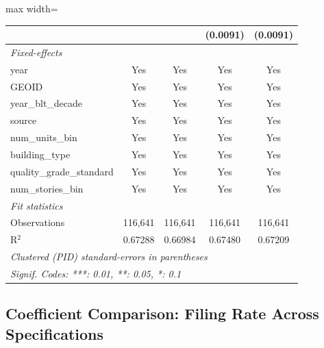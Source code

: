 \documentclass[
  11pt,
]{article}
\begin{document}
\begin{adjustbox}{max width=\textwidth}
\begin{tabular}{lcccc}
                                                           &                 &                 & (0.0091)        & (0.0091)\\   
   \midrule
   \emph{Fixed-effects}\\
   year                                                    & Yes             & Yes             & Yes             & Yes\\  
   GEOID                                                   & Yes             & Yes             & Yes             & Yes\\  
   year\_blt\_decade                                       & Yes             & Yes             & Yes             & Yes\\  
   source                                                  & Yes             & Yes             & Yes             & Yes\\  
   num\_units\_bin                                         & Yes             & Yes             & Yes             & Yes\\  
   building\_type                                          & Yes             & Yes             & Yes             & Yes\\  
   quality\_grade\_standard                                & Yes             & Yes             & Yes             & Yes\\  
   num\_stories\_bin                                       & Yes             & Yes             & Yes             & Yes\\  
   \midrule
   \emph{Fit statistics}\\
   Observations                                            & 116,641         & 116,641         & 116,641         & 116,641\\  
   R$^2$                                                   & 0.67288         & 0.66984         & 0.67480         & 0.67209\\  
   \midrule \midrule
   \multicolumn{5}{l}{\emph{Clustered (PID) standard-errors in parentheses}}\\
   \multicolumn{5}{l}{\emph{Signif. Codes: ***: 0.01, **: 0.05, *: 0.1}}\\
\end{tabular}
\par\endgroup

\end{adjustbox}

\subsection{Coefficient Comparison: Filing Rate Across
Specifications}\label{coefficient-comparison-filing-rate-across-specifications}
\end{document}
